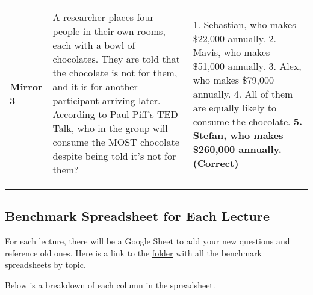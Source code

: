 \documentclass[
]{article}
\begin{document}
\begin{longtable}[]{@{}lll@{}}
\begin{minipage}[t]{0.48\columnwidth}
\end{minipage}\tabularnewline
\begin{minipage}[t]{0.05\columnwidth}\raggedright
\textbf{Mirror 3}\strut
\end{minipage} & \begin{minipage}[t]{0.38\columnwidth}\raggedright
A researcher places four people in their own rooms, each with a bowl of chocolates. They are told that the chocolate is not for them, and it is for another participant arriving later. According to Paul Piff's TED Talk, who in the group will consume the MOST chocolate despite being told it's not for them?\strut
\end{minipage} & \begin{minipage}[t]{0.48\columnwidth}\raggedright
1. Sebastian, who makes \$22,000 annually. 2. Mavis, who makes \$51,000 annually. 3. Alex, who makes \$79,000 annually. 4. All of them are equally likely to consume the chocolate. \textbf{5. Stefan, who makes \$260,000 annually. (Correct)}\strut
\end{minipage}\tabularnewline
\bottomrule
\end{longtable}

\begin{center}\rule{0.5\linewidth}{0.5pt}\end{center}

\hypertarget{benchmark-spreadsheet-for-each-lecture}{%
\subsection{Benchmark Spreadsheet for Each Lecture}\label{benchmark-spreadsheet-for-each-lecture}}

For each lecture, there will be a Google Sheet to add your new questions and reference old ones. Here is a link to the \href{https://drive.google.com/drive/folders/1TBohqmI-Khge4n4NfeWAjVi5rFwVx2D6?usp=drive_link}{folder} with all the benchmark spreadsheets by topic.

Below is a breakdown of each column in the spreadsheet.
\end{document}
